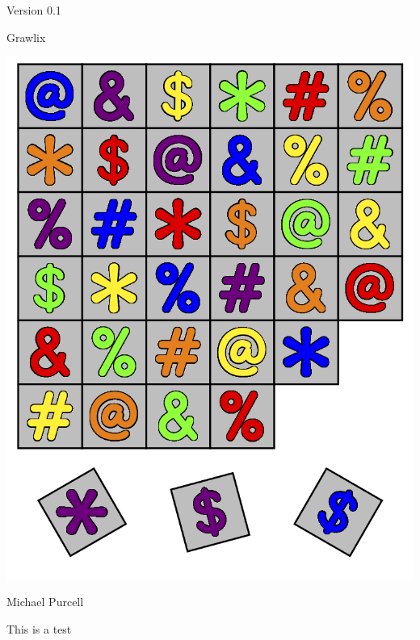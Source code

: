\documentclass[a4paper, 10pt, notumble]{leaflet}
\begin{document}
{
\begin{center}
\setmainfont{Quicksand-Medium}
\footnotesize
Version 0.1
\end{center}


\begin{center}
\setmainfont[Scale=2.175]{Cooper Black}
\Huge Grawlix
\end{center}

\vfill

\begin{center}
	\includegraphics[scale=0.275]{Images/cover_image.png}
\end{center}

\begin{center}
\setmainfont{Quicksand-Medium}
\Huge Michael Purcell
\end{center}
}

\newpage

This is a test
\end{document}
